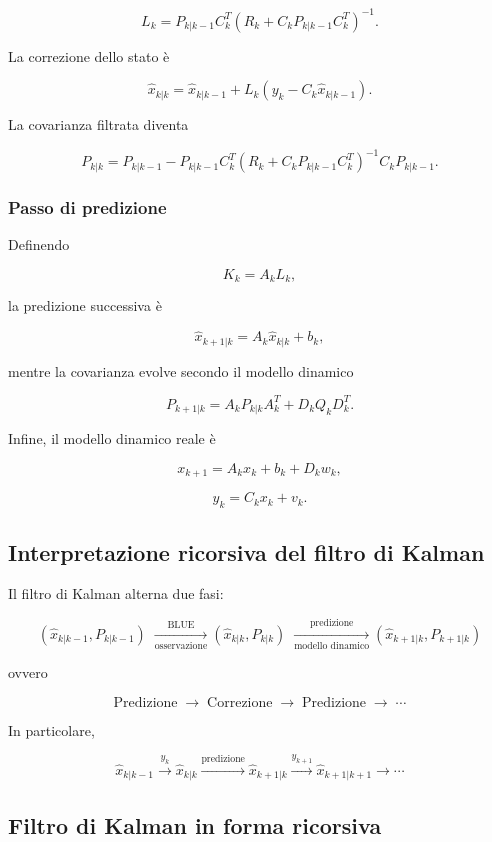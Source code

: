 \documentclass[11pt,a4paper]{article}
\begin{document}
\[
\boxed{
L_k
=
P_{k|k-1}C_k^T
\left(
R_k+C_kP_{k|k-1}C_k^T
\right)^{-1}.
}
\]

La correzione dello stato è

\[
\boxed{
\hat{x}_{k|k}
=
\hat{x}_{k|k-1}
+
L_k
\left(
y_k-C_k\hat{x}_{k|k-1}
\right).
}
\]

La covarianza filtrata diventa

\[
\boxed{
P_{k|k}
=
P_{k|k-1}
-
P_{k|k-1}C_k^T
\left(
R_k+C_kP_{k|k-1}C_k^T
\right)^{-1}
C_kP_{k|k-1}.
}
\]

\subsubsection*{Passo di predizione}

Definendo

\[
K_k=A_kL_k,
\]

la predizione successiva è

\[
\boxed{
\hat{x}_{k+1|k}
=
A_k\hat{x}_{k|k}
+
b_k,
}
\]

mentre la covarianza evolve secondo il modello dinamico

\[
\boxed{
P_{k+1|k}
=
A_kP_{k|k}A_k^T
+
D_kQ_kD_k^T.
}
\]

Infine, il modello dinamico reale è

\[
x_{k+1}
=
A_kx_k+b_k+D_kw_k,
\]

\[
y_k
=
C_kx_k+v_k.
\]

\subsection*{Interpretazione ricorsiva del filtro di Kalman}

Il filtro di Kalman alterna due fasi:

\[
\boxed{
(\hat{x}_{k|k-1},P_{k|k-1})
\;\xrightarrow[\text{osservazione}]{\text{BLUE}}
(\hat{x}_{k|k},P_{k|k})
\;\xrightarrow[\text{modello dinamico}]{\text{predizione}}
(\hat{x}_{k+1|k},P_{k+1|k})
}
\]

ovvero

\[
\text{Predizione}
\;\longrightarrow\;
\text{Correzione}
\;\longrightarrow\;
\text{Predizione}
\;\longrightarrow\;
\cdots
\]

In particolare,

\[
\hat{x}_{k|k-1}
\overset{y_k}{\longrightarrow}
\hat{x}_{k|k}
\overset{\text{predizione}}{\longrightarrow}
\hat{x}_{k+1|k}
\overset{y_{k+1}}{\longrightarrow}
\hat{x}_{k+1|k+1}
\longrightarrow\cdots
\]

\subsection*{Filtro di Kalman in forma ricorsiva}
\end{document}
